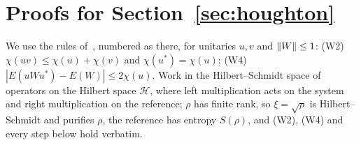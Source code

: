 \section{Proofs for Section~\ref{sec:houghton}}\label{app:houghton}

We use the rules of~\cite[Appendix~C.1]{DouglasMghirbiC}, numbered as there, for unitaries $u,v$ and $\lVert W\rVert\le1$: (W2) $\chi(uv)\le\chi(u)+\chi(v)$ and $\chi(u^*)=\chi(u)$; (W4)
$|E(uWu^*)-E(W)|\le2\chi(u)$. Work in the Hilbert--Schmidt space of operators on the Hilbert space $\mathcal H$, where left multiplication acts on the system and right
multiplication on the reference; $\rho$ has finite rank, so $\xi=\sqrt\rho$ is Hilbert--Schmidt and purifies $\rho$, the reference has entropy
$S(\rho)$, and (W2), (W4) and every step below hold verbatim.

